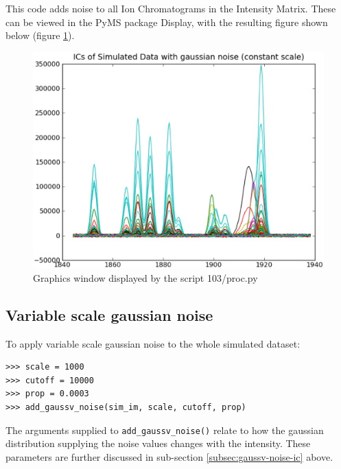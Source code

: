 This code adds noise to all Ion Chromatograms in the Intensity Matrix. These can be 
viewed in the PyMS package Display, with the resulting figure shown below (figure 
\ref{fig:gaussc-noise}).



\begin{figure}[h]
  \begin{center}
    \includegraphics[scale=0.25]{graphics/chapter10/test-103.eps}
  \end{center}
  \caption{Graphics window displayed by the script 103/proc.py}
  \label{fig:gaussc-noise}
\end{figure}


\subsection{Variable scale gaussian noise}
\label{subsec:gaussv-noise}

To apply variable scale gaussian noise to the whole simulated dataset:

\begin{verbatim}
>>> scale = 1000
>>> cutoff = 10000
>>> prop = 0.0003
>>> add_gaussv_noise(sim_im, scale, cutoff, prop)
\end{verbatim}

The arguments supplied to {\tt add\_gaussv\_noise()} relate to how the gaussian distribution
supplying the noise values changes with the intensity. These parameters are further discussed in 
sub-section \ref{subsec:gaussv-noise-ic} above.


